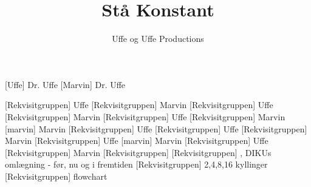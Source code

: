 \documentclass[a4paper,11pt]{article}
\title{Stå Konstant}
\author{Uffe og Uffe Productions\texttrademark}
\begin{document}
\maketitle

\begin{roles}
[Uffe] Dr. Uffe
[Marvin] Dr. Uffe
\end{roles}

\begin{props}

[Rekvisitgruppen] Uffe
[Rekvisitgruppen] Marvin
[Rekvisitgruppen] Uffe
[Rekvisitgruppen] Marvin
[Rekvisitgruppen] Uffe
[Rekvisitgruppen] Marvin
[marvin] Marvin
[Rekvisitgruppen] Uffe
[Rekvisitgruppen] Uffe
[Rekvisitgruppen] Marvin
[Rekvisitgruppen] Uffe
[marvin] Marvin
[Rekvisitgruppen] Uffe
[Rekvisitgruppen] Marvin
[Rekvisitgruppen] 
[Rekvisitgruppen] , DIKUs omlægning - før, nu og i fremtiden
[Rekvisitgruppen] 2,4,8,16 kyllinger
[Rekvisitgruppen] flowchart
\end{props}
\end{document}
